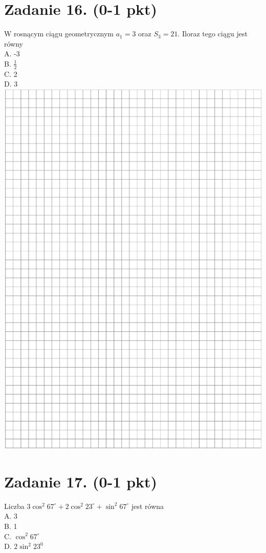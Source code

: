 \documentclass[10pt]{article}
\begin{document}
\section*{Zadanie 16. (0-1 pkt)}
W rosnącym ciągu geometrycznym \(a_{1}=3\) oraz \(S_{3}=21\). Iloraz tego ciągu jest równy\\
A. -3\\
B. \(\frac{1}{2}\)\\
C. 2\\
D. 3\\
\includegraphics[max width=\textwidth, center]{2024_11_21_997c30e0b98e62837d84g-07}

\section*{Zadanie 17. (0-1 pkt)}
Liczba \(3 \cos ^{2} 67^{\circ}+2 \cos ^{2} 23^{\circ}+\sin ^{2} 67^{\circ}\) jest równa\\
A. 3\\
B. 1\\
C. \(\cos ^{2} 67^{\circ}\)\\
D. \(2 \sin ^{2} 23^{0}\)
\end{document}
